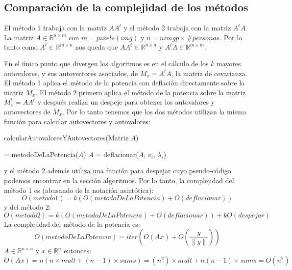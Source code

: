 \subsection{Comparación de la complejidad de los métodos}
El método 1 trabaja con la matriz $AA^t$ y el método 2 trabaja con la matriz $A^tA$.
La matriz $A\in\mathbb{R}^{n \times m}$ con $m = pixels(img)$ y $n = nimgp \times \#personas$. Por lo tanto como $A^t\in\mathbb{R}^{m \times n}$ nos
queda que $AA^t\in\mathbb{R}^{n \times n}$ y $A^tA\in\mathbb{R}^{m \times m}$.

En el \'unico punto que divergen los algoritmos es en el c\'alculo de los $k$ mayores autovalores, y sus
autovectores asociados, de $M_x = A^tA$, la matriz de covarianza. 
El m\'etodo 1 aplica el m\'etodo de la potencia con deflaci\'on directamente sobre la matriz $M_x$. 
El m\'etodo 2 primero aplica el m\'etodo de la potencia sobre la matriz $M^t_x = AA^t$ y después realiza un despeje para obtener los 
autovalores y autovectores de $M_x$. 
Por lo tanto tenemos que los dos métodos utilizan la misma función para calcular autovectores y autovalores:
\begin{algorithm}
\caption{calcularAutovaloresYAutovectores(Matriz $A$)}
\label{pseudo:calcularAutovaloresYAutovectores}
\begin{algorithmic}
  \STATE [$v_i$, $\lambda_i$] = metodoDeLaPotencia($A$)
  \STATE $A$ = deflacionar($A$, $v_i$, $\lambda_i$)
\ENDFOR
\end{algorithmic}
\end{algorithm}
y el método 2 además utiliza una función para despejar cuyo pseudo-código podemos encontrar en la sección algoritmos. Por lo tanto, 
la complejidad del método 1 es (abusando de la notación asintótica):
\begin{displaymath}
  O(metodo1) = k (O(metodoDeLaPotencia) + O(deflacionar))
\end{displaymath}
y del método 2:
\begin{displaymath}
  O(metodo2) = k (O(metodoDeLaPotencia) + O(deflacionar)) + k O(despejar)
\end{displaymath}
La complejidad del método de la potencia es:
\begin{displaymath}
  O(metodoDeLaPotencia) = iter (O(Ax) + O(\frac{y}{{\parallel}y{\parallel}}))
\end{displaymath}
$A\in\mathbb{R}^{n \times n}$ y $x\in\mathbb{R}^n$ entonces:
\begin{displaymath}
  O(Ax) = n(n \times mult + (n-1) \times sums) = (n^2)\times mult + n(n-1)\times sums = O(n^2)
\end{displaymath}
